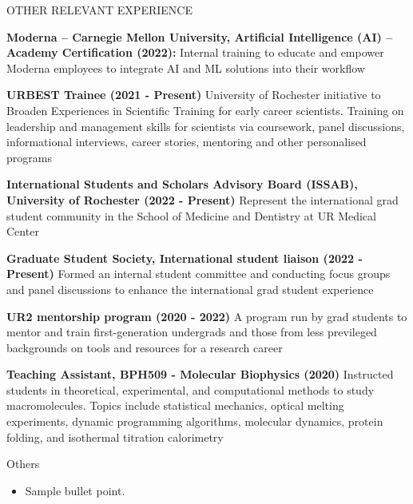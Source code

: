 \documentclass{resume} %
\begin{document}

\begin{rSection}{OTHER RELEVANT EXPERIENCE}
\vspace{-1.25em}
\item \textbf{Moderna – Carnegie Mellon University, Artificial Intelligence (AI) – Academy Certification (2022):} { 
Internal training to educate and empower Moderna employees to integrate AI and ML solutions into their workflow} 
\item \textbf{URBEST Trainee (2021 - Present)} {University of Rochester initiative to Broaden Experiences in Scientific Training for early career scientists. Training on leadership and management skills for scientists via coursework, panel discussions, informational interviews, career stories, mentoring and other personalised programs}
\item \textbf{International Students and Scholars Advisory Board (ISSAB), University of Rochester (2022 - Present)} {Represent the international grad student community in the School of Medicine and Dentistry at UR Medical Center}
\item \textbf{Graduate Student Society, International student liaison (2022 - Present)} {Formed an internal student committee and conducting focus groups and panel discussions to enhance the international grad student experience}
\item \textbf{UR2 mentorship program (2020 - 2022)} {A program run by grad students to mentor and train first-generation undergrads and those from less previleged backgrounds on tools and resources for a research career}
\item \textbf{Teaching Assistant, BPH509 - Molecular Biophysics (2020)} {Instructed students in theoretical, experimental, and computational methods to study macromolecules. Topics include statistical mechanics, optical melting experiments, dynamic 
programming algorithms, molecular dynamics, protein folding, and isothermal titration calorimetry
}
\end{rSection} 

\begin{rSection}{Others} 
\begin{itemize}
    \item	Sample bullet point.
\end{itemize}


\end{rSection}
\end{document}

